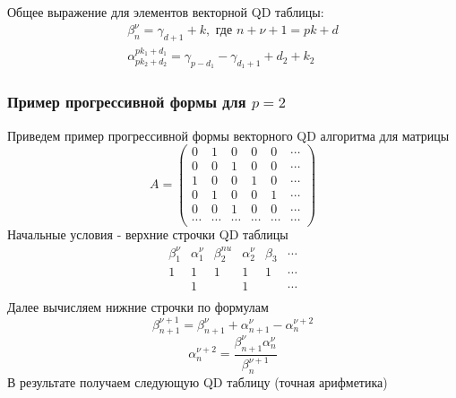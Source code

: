 Общее выражение для элементов векторной QD
таблицы:
\begin{eqnarray*}
\displaystyle\beta_n^{\nu}= \gamma_{d+1}+k, \mbox{  где  } n+\nu+1=pk+d \nonumber\\
\displaystyle\alpha^{pk_1+d_1}_{pk_2+d_2} =
\gamma_{p-d_1}-\gamma_{d_1+1}+d_2+k_2 \nonumber
\end{eqnarray*}


\subsubsection{Пример прогрессивной формы для $p=2$} Приведем
пример прогрессивной формы векторного QD алгоритма для матрицы
$$%
A=\left(
\begin{array}{ccccccccccccc}
0 & 1 & 0 & 0 & 0 & \cdots \\
0 & 0 & 1 & 0 & 0 & \cdots \\
1 & 0 & 0 & 1 & 0 & \cdots \\
0 & 1 & 0 & 0 & 1 & \cdots \\
0 & 0 & 1 & 0 & 0 & \cdots \\
\cdots & \cdots  & \cdots & \cdots & \cdots & \cdots
\end{array}
\right)
$$%
Начальные условия - верхние строчки QD таблицы
$$%
\begin{array}{ccccccccccccccccc}
\beta_1^{\nu} & \alpha_1^{\nu} & \beta_2^{nu} & \alpha_2^{\nu} & \beta_3 & \cdots \\
1 & 1 & 1 & 1 & 1 & \cdots \\
 & 1 &  & 1 &  & \cdots \\
\end{array}
$$%
Далее вычисляем нижние строчки по формулам
$$\beta_{n+1}^{\nu+1}=\beta_{n+1}^{\nu}+\alpha_{n+1}^{\nu}-\alpha_{n}^{\nu+2}$$
$$\alpha_{n}^{\nu+2}=\displaystyle\frac{\beta_{n+1}^{\nu}\alpha_{n}^{\nu}} {\beta_{n}^{\nu+1}}$$
В результате получаем следующую QD таблицу (точная арифметика)
